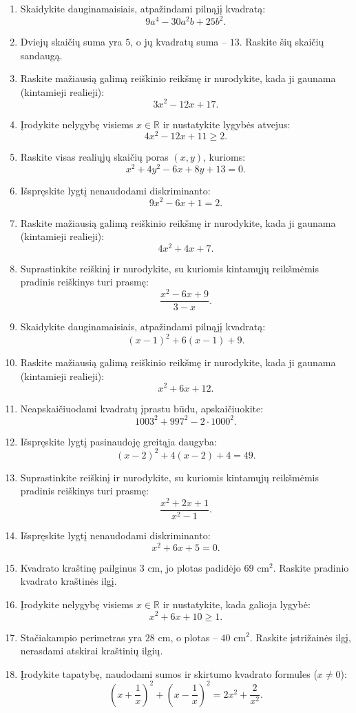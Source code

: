 \documentclass[11pt,a4paper]{article}
\begin{document}
\begin{enumerate}
\item Skaidykite dauginamaisiais, atpažindami pilnąjį kvadratą:\[9a^4-30a^2b+25b^2.\]
\item Dviejų skaičių suma yra \(5\), o jų kvadratų suma -- \(13\). Raskite šių skaičių sandaugą.
\item Raskite mažiausią galimą reiškinio reikšmę ir nurodykite, kada ji gaunama (kintamieji realieji):\[3x^2-12x+17.\]
\item Įrodykite nelygybę visiems \(x\in\mathbb R\) ir nustatykite lygybės atvejus:\[4x^2-12x+11\ge2.\]
\item Raskite visas realiųjų skaičių poras \((x,y)\), kurioms:\[x^2+4y^2-6x+8y+13=0.\]
\item Išspręskite lygtį nenaudodami diskriminanto:\[9x^2-6x+1=2.\]
\item Raskite mažiausią galimą reiškinio reikšmę ir nurodykite, kada ji gaunama (kintamieji realieji):\[4x^2+4x+7.\]
\item Suprastinkite reiškinį ir nurodykite, su kuriomis kintamųjų reikšmėmis pradinis reiškinys turi prasmę:\[\frac{x^2-6x+9}{3-x}.\]
\item Skaidykite dauginamaisiais, atpažindami pilnąjį kvadratą:\[(x-1)^2+6(x-1)+9.\]
\item Raskite mažiausią galimą reiškinio reikšmę ir nurodykite, kada ji gaunama (kintamieji realieji):\[x^2+6x+12.\]
\item Neapskaičiuodami kvadratų įprastu būdu, apskaičiuokite:\[1003^2+997^2-2\cdot1000^2.\]
\item Išspręskite lygtį pasinaudoję greitąja daugyba:\[(x-2)^2+4(x-2)+4=49.\]
\item Suprastinkite reiškinį ir nurodykite, su kuriomis kintamųjų reikšmėmis pradinis reiškinys turi prasmę:\[\frac{x^2+2x+1}{x^2-1}.\]
\item Išspręskite lygtį nenaudodami diskriminanto:\[x^2+6x+5=0.\]
\item Kvadrato kraštinę pailginus \(3\) cm, jo plotas padidėjo \(69\text{ cm}^2\). Raskite pradinio kvadrato kraštinės ilgį.
\item Įrodykite nelygybę visiems \(x\in\mathbb R\) ir nustatykite, kada galioja lygybė:\[x^2+6x+10\ge1.\]
\item Stačiakampio perimetras yra \(28\) cm, o plotas -- \(40\text{ cm}^2\). Raskite įstrižainės ilgį, nerasdami atskirai kraštinių ilgių.
\item Įrodykite tapatybę, naudodami sumos ir skirtumo kvadrato formules (\(x\ne0\)):\[(x+\frac1x)^2+(x-\frac1x)^2=2x^2+\frac2{x^2}.\]

\end{enumerate}
\end{document}
